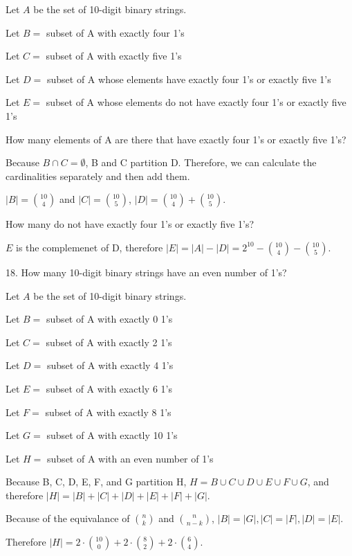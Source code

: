 \documentclass{hippoidC}
\begin{document}
\begin{prooflist}{ Let $A$ be the set of 10-digit binary strings. }
    \item Let $B=$ subset of A with exactly four 1's
    \item Let $C=$ subset of A with exactly five 1's
    \item Let $D=$ subset of A whose elements have exactly four 1’s or exactly five 1’s
    \item Let $E=$ subset of A whose elements do not have exactly four 1’s or exactly five 1’s
    \item How many elements of A are there that have exactly four 1’s or exactly five 1’s?
    \item Because $B \cap C=\emptyset$, B and C partition D. Therefore, we can
        calculate the cardinalities separately and then add them.
    \item $|B|=\binom{10}{4}$ and $|C|=\binom{10}{5}$, $|D|= \binom{10}{4}+\binom{10}{5}$.
    \item How many do not have exactly four 1’s or exactly five 1’s?
    \item $E$ is the complemenet of D, therefore $|E| = |A| - |D| = 2^{10} -
        \binom{10}{4}-\binom{10}{5}$.
\end{prooflist}

\begin{prooflist}{18. How many 10-digit binary strings have an even number of 1’s?}
    \item Let $A$ be the set of 10-digit binary strings.
    \item Let $B=$ subset of A with exactly 0 1's
    \item Let $C=$ subset of A with exactly 2 1's
    \item Let $D=$ subset of A with exactly 4 1's
    \item Let $E=$ subset of A with exactly 6 1's
    \item Let $F=$ subset of A with exactly 8 1's
    \item Let $G=$ subset of A with exactly 10 1's
    \item Let $H=$ subset of A with an even number of 1's
    \item Because B, C, D, E, F, and G partition H, $H=B\cup C\cup D\cup E \cup
        F \cup G$, and therefore $|H|=|B| + |C| + |D| + |E| + |F| + |G|$.
    \item Because of the equivalance of $\binom{n}{k}$ and $\binom{n}{n-k}$,
        $|B|=|G|, |C|=|F|, |D|=|E|$.
    \item Therefore $|H| =
        2\cdot \binom{10}{0} +
        2\cdot \binom{8}{2} +
        2\cdot \binom{6}{4}$.
\end{prooflist}
\end{document}
